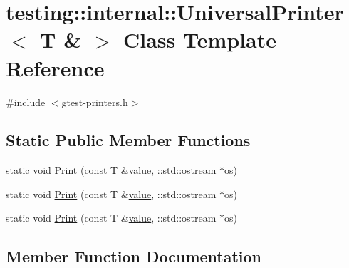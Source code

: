 \hypertarget{classtesting_1_1internal_1_1_universal_printer_3_01_t_01_6_01_4}{}\section{testing\+::internal\+::Universal\+Printer$<$ T \& $>$ Class Template Reference}
\label{classtesting_1_1internal_1_1_universal_printer_3_01_t_01_6_01_4}


{\ttfamily \#include $<$gtest-\/printers.\+h$>$}

\subsection*{Static Public Member Functions}
\begin{DoxyCompactItemize}
\item 
static void \mbox{\hyperlink{classtesting_1_1internal_1_1_universal_printer_3_01_t_01_6_01_4_a923a694be8aa66117848c1c5f57ede35}{Print}} (const T \&\mbox{\hyperlink{_obj__test_2lib_2googletest-master_2googlemock_2test_2gmock-matchers__test_8cc_a337b8a670efc0b086ad3af163f3121b6}{value}}, \+::std\+::ostream $\ast$os)
\item 
static void \mbox{\hyperlink{classtesting_1_1internal_1_1_universal_printer_3_01_t_01_6_01_4_a923a694be8aa66117848c1c5f57ede35}{Print}} (const T \&\mbox{\hyperlink{_obj__test_2lib_2googletest-master_2googlemock_2test_2gmock-matchers__test_8cc_a337b8a670efc0b086ad3af163f3121b6}{value}}, \+::std\+::ostream $\ast$os)
\item 
static void \mbox{\hyperlink{classtesting_1_1internal_1_1_universal_printer_3_01_t_01_6_01_4_a923a694be8aa66117848c1c5f57ede35}{Print}} (const T \&\mbox{\hyperlink{_obj__test_2lib_2googletest-master_2googlemock_2test_2gmock-matchers__test_8cc_a337b8a670efc0b086ad3af163f3121b6}{value}}, \+::std\+::ostream $\ast$os)
\end{DoxyCompactItemize}


\subsection{Member Function Documentation}
\mbox{\label{classtesting_1_1internal_1_1_universal_printer_3_01_t_01_6_01_4_a923a694be8aa66117848c1c5f57ede35}} 
